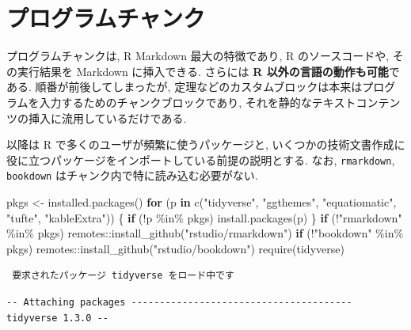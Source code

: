 \documentclass[
]{bxjsbook}
\newenvironment{Shaded}{\begin{snugshade}}{\end{snugshade}}
\newcommand{\ControlFlowTok}[1]{\textcolor[rgb]{0.13,0.29,0.53}{\textbf{#1}}}
\newcommand{\FunctionTok}[1]{\textcolor[rgb]{0.00,0.00,0.00}{#1}}
\newcommand{\NormalTok}[1]{#1}
\newcommand{\OtherTok}[1]{\textcolor[rgb]{0.56,0.35,0.01}{#1}}
\newcommand{\SpecialCharTok}[1]{\textcolor[rgb]{0.00,0.00,0.00}{#1}}
\newcommand{\StringTok}[1]{\textcolor[rgb]{0.31,0.60,0.02}{#1}}
\theoremstyle{definition}
\theoremstyle{definition}
\theoremstyle{definition}
\theoremstyle{remark}
\begin{document}
\hypertarget{ux30d7ux30edux30b0ux30e9ux30e0ux30c1ux30e3ux30f3ux30af}{%
\section{プログラムチャンク}\label{ux30d7ux30edux30b0ux30e9ux30e0ux30c1ux30e3ux30f3ux30af}}

プログラムチャンクは, R Markdown 最大の特徴であり, R のソースコードや,
その実行結果を Markdown に挿入できる. さらには \textbf{R
以外の言語の動作も可能}である. 順番が前後してしまったが,
定理などのカスタムブロックは本来はプログラムを入力するためのチャンクブロックであり,
それを静的なテキストコンテンツの挿入に流用しているだけである.

以降は R で多くのユーザが頻繁に使うパッケージと,
いくつかの技術文書作成に役に立つパッケージをインポートしている前提の説明とする.
なお, \texttt{rmarkdown}, \texttt{bookdown}
はチャンク内で特に読み込む必要がない.

\begin{Shaded}
\begin{Highlighting}[numbers=left,,]
\NormalTok{pkgs }\OtherTok{\textless{}{-}} \FunctionTok{installed.packages}\NormalTok{()}
\ControlFlowTok{for}\NormalTok{ (p }\ControlFlowTok{in} \FunctionTok{c}\NormalTok{(}\StringTok{"tidyverse"}\NormalTok{, }\StringTok{"ggthemes"}\NormalTok{, }\StringTok{"equatiomatic"}\NormalTok{, }\StringTok{"tufte"}\NormalTok{, }\StringTok{"kableExtra"}\NormalTok{)) \{}
  \ControlFlowTok{if}\NormalTok{ (}\SpecialCharTok{!}\NormalTok{p }\SpecialCharTok{\%in\%}\NormalTok{ pkgs) }\FunctionTok{install.packages}\NormalTok{(p)}
\NormalTok{\}}
\ControlFlowTok{if}\NormalTok{ (}\SpecialCharTok{!}\StringTok{"rmarkdown"} \SpecialCharTok{\%in\%}\NormalTok{ pkgs) remotes}\SpecialCharTok{::}\FunctionTok{install\_github}\NormalTok{(}\StringTok{"rstudio/rmarkdown"}\NormalTok{)}
\ControlFlowTok{if}\NormalTok{ (}\SpecialCharTok{!}\StringTok{"bookdown"} \SpecialCharTok{\%in\%}\NormalTok{ pkgs) remotes}\SpecialCharTok{::}\FunctionTok{install\_github}\NormalTok{(}\StringTok{"rstudio/bookdown"}\NormalTok{)}
\FunctionTok{require}\NormalTok{(tidyverse)}
\end{Highlighting}
\end{Shaded}

\begin{verbatim}
 要求されたパッケージ tidyverse をロード中です 
\end{verbatim}

\begin{verbatim}
-- Attaching packages --------------------------------------- tidyverse 1.3.0 --
\end{verbatim}
\end{document}
